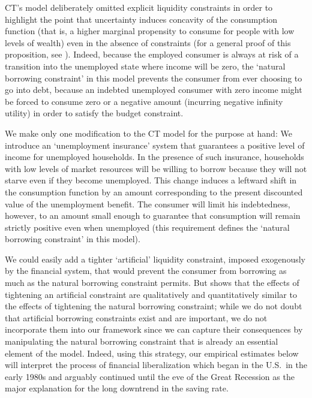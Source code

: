 \documentclass[titlepage]{\econtex}
\begin{document}
CT's model deliberately omitted explicit liquidity constraints in order to highlight the point that uncertainty induces concavity of the consumption function (that is, a higher marginal propensity to consume for people with low levels of wealth) even in the absence of constraints (for a general proof of this proposition, see \cite{carroll&kimball:concavity}).  Indeed, because the employed consumer is always at risk of a transition into the unemployed state where income will be zero, the `natural borrowing constraint' in this model prevents the consumer from ever choosing to go into debt, because an indebted unemployed consumer with zero income might be forced to consume zero or a negative amount (incurring negative infinity utility) in order to satisfy the budget constraint.

We make only one modification to the CT model for the purpose at hand: We introduce an `unemployment insurance' system that guarantees a positive level of income for unemployed households.  In the presence of such insurance, households with low levels of market resources will be willing to borrow because they will not starve even if they become unemployed.  This change induces a leftward shift in the consumption function by an amount corresponding to the present discounted value of the unemployment benefit.  The consumer will limit his indebtedness, however, to an amount small enough to guarantee that consumption will remain strictly positive even when unemployed (this requirement defines the `natural borrowing constraint' in this model).

We could easily add a tighter `artificial' liquidity constraint, imposed exogenously by the financial system, that would prevent the consumer from borrowing as much as the natural borrowing constraint permits.  But \cite{carroll:atheoryjep} shows that the effects of tightening an artificial constraint are qualitatively and quantitatively similar to the effects of tightening the natural borrowing constraint; while we do not doubt that artificial borrowing constraints exist and are important, we do not incorporate them into our framework since we can capture their consequences by manipulating the natural borrowing constraint that is already an essential element of the model.  Indeed, using this strategy, our empirical estimates below will interpret the process of financial liberalization which began in the U.S.\ in the early 1980s and arguably continued until the eve of the Great Recession as the major explanation for the long downtrend in the saving rate.
\end{document}
